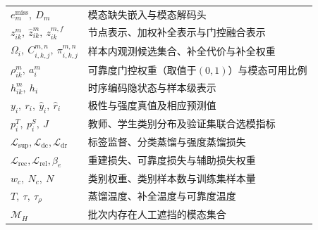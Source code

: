 \begin{longtable}{>{\centering\arraybackslash}p{3.6cm}>{\centering\arraybackslash}p{\dimexpr\linewidth-3.6cm-4\tabcolsep\relax}}
$e^{\mathrm{miss}}_m,\ D_m$ & 模态缺失嵌入与模态解码头 \\
$z^m_{ik},\ \hat z^m_{ik},\ z^{m,f}_{ik}$ & 节点表示、加权补全表示与门控融合表示 \\
$\Omega_i,\ C^{m,n}_{i,k,j},\ \pi^{m,n}_{i,k,j}$ & 样本内观测候选集合、补全代价与补全权重 \\
$\rho^m_{ik},\ a^m_i$ & 可靠度门控权重（取值于$(0,1)$）与模态可用比例 \\
$h^m_{ik},\ h_i$ & 时序编码隐状态与样本级表示 \\
$y_i,\ r_i,\ \hat y_i,\ \hat r_i$ & 极性与强度真值及相应预测值 \\
$p_i^T,\ p_i^S,\ J$ & 教师、学生类别分布及验证集联合选模指标 \\
$\mathcal L_{\mathrm{sup}},\mathcal L_{\mathrm{dc}},\mathcal L_{\mathrm{dr}}$ & 标签监督、分类蒸馏与强度蒸馏损失 \\
$\mathcal L_{\mathrm{rec}},\mathcal L_{\mathrm{rel}},\beta_e$ & 重建损失、可靠度损失与辅助损失权重 \\
$w_c,\ N_c,\ N$ & 类别权重、类别样本数与训练集样本量 \\
$T,\ \tau,\ \tau_\rho$ & 蒸馏温度、补全温度与可靠度温度 \\
$\mathcal M_H$ & 批次内存在人工遮挡的模态集合 \\
\end{longtable}